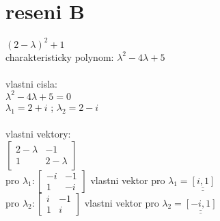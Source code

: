 \documentclass[a4paper]{article}
\def\doubleunderline#1{\underline{\underline{#1}}}
\begin{document}
\section*{reseni B}
$(2-\lambda)^2+1$\\
charakteristicky polynom: \doubleunderline{$\lambda^2-4\lambda+5$}\\
\\
vlastni cisla:\\
$\lambda^2-4\lambda+5=0$\\
\doubleunderline{$\lambda_1 = 2+i$} ; 
\doubleunderline{$\lambda_2 = 2-i$}\\
\\
vlastni vektory:\\
$
\left[\begin{matrix}
	2-\lambda & -1\\
	1 & 2-\lambda
	\end{matrix}\right]
$\\
pro $\lambda_1: \left[\begin{matrix}
	-i & -1\\
	1 & -i
	\end{matrix}\right]$
vlastni vektor pro $\lambda_1 = \doubleunderline{[i,1]}$\\
pro $\lambda_2: \left[\begin{matrix}
	i & -1\\
	1 & i
	\end{matrix}\right]$
vlastni vektor pro $\lambda_2 = \doubleunderline{[-i,1]}$\\
\end{document}
